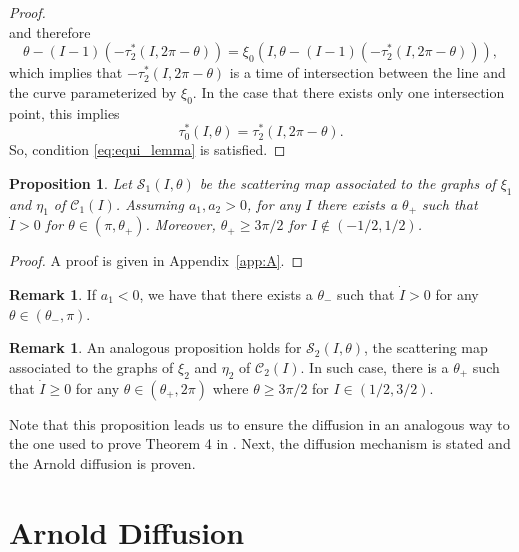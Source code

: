 \documentclass[a4paper,10pt]{article}
\newcommand{\NH}{\text{NHIM}}
\newcommand{\zeroM}{\text{0}}
\newcommand{\oneM}{\text{2}}
\newcommand{\zerom}{\text{1}}
\newtheorem{proposition}[theorem]{Proposition}
\theoremstyle{definition}
\newtheorem{remark}[theorem]{Remark}
\begin{document}
\begin{proof}
\begin{equation*}
\end{equation*}
and therefore
\begin{equation*}
\theta - (I-1)(-\tau_{\oneM}^*(I,2\pi - \theta)) = \xi_{\zeroM}(I,\theta - (I-1)(-\tau_{\oneM}^*(I,2\pi-\theta))),
\end{equation*}
which implies that $-\tau_{\oneM}^*(I,2\pi- \theta)$ is a time of intersection between the {\NH} line and the curve parameterized by $\xi_{\zeroM}$.
In the case that there exists only one intersection point, this implies
\begin{equation*}
\tau_{\zeroM}^*(I,\theta) = \tau_{\oneM}^*(I,2\pi- \theta).
\end{equation*}
So, condition \eqref{eq:equi_lemma} is satisfied.
\end{proof}

\begin{proposition}
Let $\mathcal{S}_{\zerom}(I,\theta)$ be the scattering map associated to the graphs of $\xi_{\zerom}$ and $\eta_{\zerom}$ of $\mathcal{C}_1(I)$.
Assuming $a_1,a_2 >0$, for any $I$ there exists a $\theta_{+}$ such that $\dot{I}>0$ for $\theta \in (\pi, \theta_{+})$.
Moreover, $\theta_{+}\geq 3\pi/2$ for $I\notin(-1/2 , 1/2)$.  \label{prop:orb_cres}
\end{proposition}
\begin{proof}
A proof is given in Appendix~\ref{app:A}.
\end{proof}
\begin{remark}
If $a_1 < 0$, we have that there exists a $\theta_-$ such that $\dot{I}> 0$  for any $\theta \in (\theta_- , \pi)$.
\end{remark}
\begin{remark}
An analogous proposition holds for $\mathcal{S}_{\oneM}(I,\theta)$, the scattering map associated to the graphs of $\xi_{\oneM}$ and $\eta_{\oneM}$ of $\mathcal{C}_2(I)$.
In such case, there is a $\theta_+$ such that $\dot{I}\geq 0$ for any $\theta\in(\theta_+ , 2\pi)$ where $\theta \geq 3\pi/2$ for $I\in(1/2 , 3/2)$.\end{remark}

Note that this proposition leads us to ensure the diffusion in an analogous way to the one used to prove Theorem 4 in \cite{Delshams2017}.
Next, the diffusion mechanism is stated and the Arnold diffusion is proven.

\section{ Arnold Diffusion }
\label{sec:diffusion}
\end{document}
